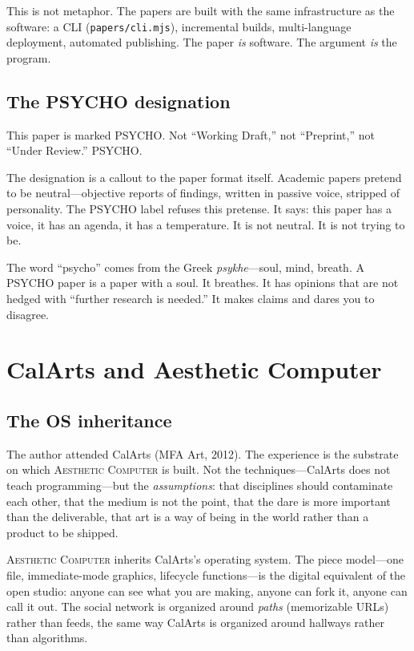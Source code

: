 \documentclass[10pt,letterpaper,twocolumn]{article}
\newcommand{\ac}{\textsc{Aesthetic Computer}}
\begin{document}
This is not metaphor. The papers are built with the same infrastructure as the software: a CLI (\texttt{papers/cli.mjs}), incremental builds, multi-language deployment, automated publishing. The paper \emph{is} software. The argument \emph{is} the program.

\subsection{The PSYCHO designation}

This paper is marked PSYCHO. Not ``Working Draft,'' not ``Preprint,'' not ``Under Review.'' PSYCHO.

The designation is a callout to the paper format itself. Academic papers pretend to be neutral---objective reports of findings, written in passive voice, stripped of personality. The PSYCHO label refuses this pretense. It says: this paper has a voice, it has an agenda, it has a temperature. It is not neutral. It is not trying to be.

The word ``psycho'' comes from the Greek \textit{psykhe}---soul, mind, breath. A PSYCHO paper is a paper with a soul. It breathes. It has opinions that are not hedged with ``further research is needed.'' It makes claims and dares you to disagree.

\section{CalArts and Aesthetic Computer}

\subsection{The OS inheritance}

The author attended CalArts (MFA Art, 2012). The experience is the substrate on which \ac{} is built. Not the techniques---CalArts does not teach programming---but the \emph{assumptions}: that disciplines should contaminate each other, that the medium is not the point, that the dare is more important than the deliverable, that art is a way of being in the world rather than a product to be shipped.

\ac{} inherits CalArts's operating system. The piece model---one file, immediate-mode graphics, lifecycle functions---is the digital equivalent of the open studio: anyone can see what you are making, anyone can fork it, anyone can call it out. The social network is organized around \emph{paths} (memorizable URLs) rather than feeds, the same way CalArts is organized around hallways rather than algorithms.
\end{document}
